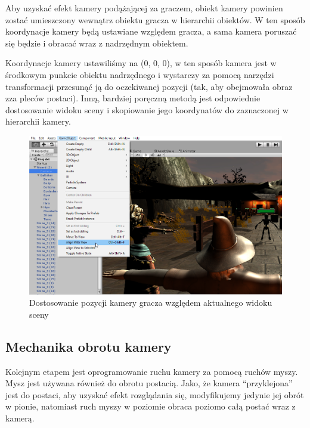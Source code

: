 \documentclass[openright]{xmgr}
\begin{document}
        Aby uzyskać efekt kamery podążającej za graczem, obiekt kamery powinien zostać umieszczony wewnątrz obiektu gracza w hierarchii obiektów. W ten sposób koordynacje kamery będą ustawiane względem gracza, a sama kamera poruszać się będzie i obracać wraz z nadrzędnym obiektem.

        Koordynacje kamery ustawiliśmy na (0, 0, 0), w ten sposób kamera jest w środkowym punkcie obiektu nadrzędnego i wystarczy za pomocą narzędzi transformacji przesunąć ją do oczekiwanej pozycji (tak, aby obejmowała obraz zza pleców postaci). Inną, bardziej poręczną metodą jest odpowiednie dostosowanie widoku sceny i skopiowanie jego koordynatów do zaznaczonej w hierarchii kamery.

        \begin{figure}[H]
        \center
        \includegraphics[width=\textwidth]{kamera_1.png}
        \caption{Dostosowanie pozycji kamery gracza względem aktualnego widoku sceny}
        \end{figure}
    
    \subsection{Mechanika obrotu kamery}

      Kolejnym etapem jest oprogramowanie ruchu kamery za pomocą ruchów myszy. Mysz jest używana również do obrotu postacią. Jako, że kamera \enquote{przyklejona} jest do postaci, aby uzyskać efekt rozglądania się, modyfikujemy jedynie jej obrót w pionie, natomiast ruch myszy w poziomie obraca poziomo całą postać wraz z kamerą.
\end{document}
